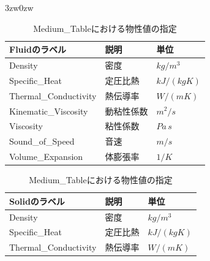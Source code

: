 \begin{indentation}{3zw}{0zw}
\begin{table}[htdp]
\caption{Medium\_Tableにおける物性値の指定}
\begin{minipage}{.45\textwidth}
\begin{center}
\begin{tabular}{lll}\\ \toprule
Fluidのラベル & 説明 & 単位\\ \midrule
Density & 密度 & $kg/m^3$\\
Specific\_Heat & 定圧比熱 & $kJ/(kg K)$\\
Thermal\_Conductivity & 熱伝導率 & $W/(m K)$\\
Kinematic\_Viscosity & 動粘性係数 & $m^2/s$\\
Viscosity & 粘性係数 & $Pa\,s$\\
Sound\_of\_Speed & 音速 & $m/s$\\
Volume\_Expansion & 体膨張率 & $1/K$\\ \bottomrule
\end{tabular}
\end{center}
\end{minipage} \hfill
\begin{minipage}{.45\textwidth}
\begin{center}
\begin{tabular}{lll}\\ \toprule
Solidのラベル & 説明 & 単位\\ \midrule
Density & 密度 & $kg/m^3$\\
Specific\_Heat & 定圧比熱 & $kJ/(kg K)$\\
Thermal\_Conductivity & 熱伝導率 & $W/(m K)$\\ \bottomrule
\end{tabular}
\end{center}
\end{minipage}
\label{tbl:medium_tbl}
\end{table}

\end{indentation}


